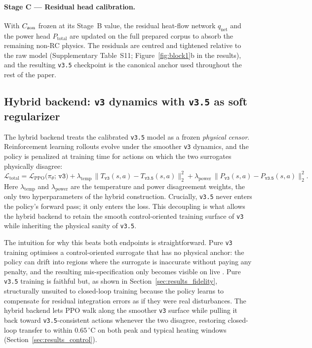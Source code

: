 \paragraph{Stage C --- Residual head calibration.}
With $C_{\mathrm{zon}}$ frozen at its Stage~B value, the residual heat-flow
network $q_{\mathrm{net}}$ and the power head $P_{\mathrm{total}}$ are
updated on the full prepared corpus to absorb the remaining
non-RC physics. The residuals are centred and tightened relative to
the raw model (Supplementary Table~S11; Figure~\ref{fig:block1}b in
the results), and the resulting \texttt{v3.5} checkpoint is the
canonical anchor used throughout the rest of the paper.

\subsection{Hybrid backend: \texttt{v3} dynamics with \texttt{v3.5} as soft regularizer}
\label{ssec:method_hybrid}

The hybrid backend treats the calibrated \texttt{v3.5} model as a frozen
\emph{physical censor}. Reinforcement learning rollouts evolve under the
smoother \texttt{v3} dynamics, and the policy is penalized at training time
for actions on which the two surrogates physically disagree:
\begin{equation}
\label{eq:hybrid_loss}
\mathcal{L}_{\mathrm{total}}
= \mathcal{L}_{\mathrm{PPO}}\bigl(\pi_\theta;\, \texttt{v3}\bigr)
+ \lambda_{\mathrm{temp}} \,
   \bigl\lVert T_{\texttt{v3}}(s,a) - T_{\texttt{v3.5}}(s,a) \bigr\rVert_2^2
+ \lambda_{\mathrm{power}} \,
   \bigl\lVert P_{\texttt{v3}}(s,a) - P_{\texttt{v3.5}}(s,a) \bigr\rVert_2^2 .
\end{equation}
Here $\lambda_{\mathrm{temp}}$ and $\lambda_{\mathrm{power}}$ are the
temperature and power disagreement weights, the only two hyperparameters of
the hybrid construction. Crucially, \texttt{v3.5} never enters the policy's
forward pass; it only enters the loss. This decoupling is what allows the
hybrid backend to retain the smooth control-oriented training surface of
\texttt{v3} while inheriting the physical sanity of \texttt{v3.5}.

The intuition for why this beats both endpoints is straightforward.
Pure \texttt{v3} training optimises a control-oriented surrogate that
has no physical anchor: the policy can drift into regions where the
surrogate is inaccurate without paying any penalty, and the resulting
mis-specification only becomes visible on live \boptest. Pure
\texttt{v3.5} training is faithful but, as shown in
Section~\ref{sec:results_fidelity}, structurally unsuited to
closed-loop training because the policy learns to compensate for
residual integration errors as if they were real disturbances. The
hybrid backend lets PPO walk along the smoother \texttt{v3} surface
while pulling it back toward \texttt{v3.5}-consistent actions whenever
the two disagree, restoring closed-loop transfer to within
$0.65\,^{\circ}\mathrm{C}$ on both peak and typical heating windows
(Section~\ref{sec:results_control}).

